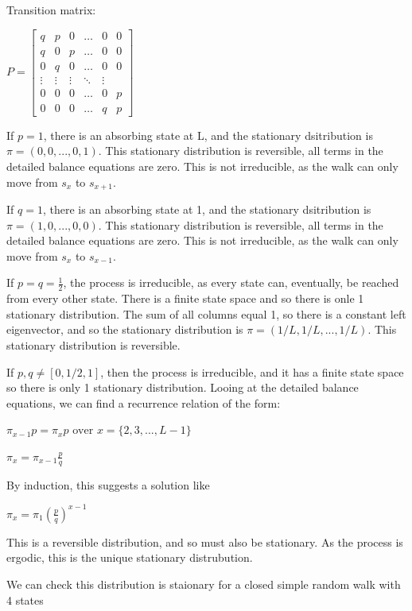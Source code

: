 \documentclass{article}
\begin{document}
Transition matrix:

$P = \begin{bmatrix}
    q & p & 0 & \dots  & 0 & 0 \\
    q & 0 & p & \dots  & 0 & 0\\
    0 & q & 0 & \dots  & 0 & 0\\
    \vdots & \vdots & \vdots & \ddots & \vdots \\
    0 & 0 & 0 & \dots & 0 & p \\
    0 & 0 & 0 & \dots & q & p
\end{bmatrix}$

If $p = 1$, there is an absorbing state at L, and the stationary dsitribution is $\pi = (0,0,...,0,1)$. This stationary distribution is reversible, all terms in the detailed balance equations are zero. This is not irreducible, as the walk can only move from $s_x$ to $s_{x+1}$. 

If $q = 1$, there is an absorbing state at 1, and the stationary dsitribution is $\pi = (1,0,...,0,0)$. This stationary distribution is reversible, all terms in the detailed balance equations are zero. This is not irreducible, as the walk can only move from $s_x$ to $s_{x-1}$. 

If $p = q =\frac{1}{2}$, the process is irreducible, as every state can, eventually, be reached from every other state. There is a finite state space and so there is onle 1 stationary distribution. The sum of all columns equal 1, so there is a constant left eigenvector, and so the stationary distribution is $\pi = (1/L, 1/L,..., 1/L)$. This stationary distribution is reversible.

If $p,q \neq [0,1/2,1]$, then the process is irreducible, and it has a finite state space so there is only 1 stationary distribution. Looing at the detailed balance equations, we can find a recurrence relation of the form:



$\pi_{x-1} p= \pi_x p \text{ over } x = \{2,3,..., L-1\}$


$ \pi_x = \pi_{x-1} \frac{p}{q} $

By induction, this suggests a solution like

$\pi_x = \pi_1 (\frac{p}{q})^{x-1}$

This is a reversible distribution, and so must also be stationary. As the process is ergodic, this is the unique stationary distrubution.

We can check this distribution is staionary for a closed simple random walk with 4 states
\end{document}
